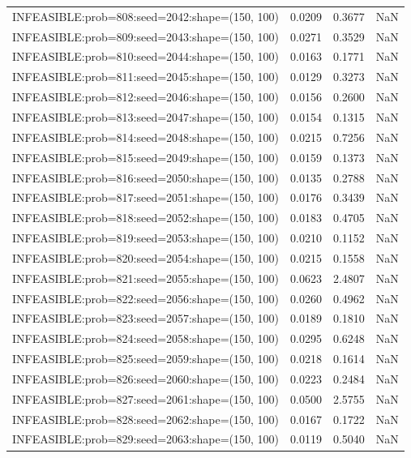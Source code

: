 \begin{longtable}{lccc}
INFEASIBLE:prob=808:seed=2042:shape=(150, 100) &   0.0209 &  0.3677 &    NaN \\
INFEASIBLE:prob=809:seed=2043:shape=(150, 100) &   0.0271 &  0.3529 &    NaN \\
INFEASIBLE:prob=810:seed=2044:shape=(150, 100) &   0.0163 &  0.1771 &    NaN \\
INFEASIBLE:prob=811:seed=2045:shape=(150, 100) &   0.0129 &  0.3273 &    NaN \\
INFEASIBLE:prob=812:seed=2046:shape=(150, 100) &   0.0156 &  0.2600 &    NaN \\
INFEASIBLE:prob=813:seed=2047:shape=(150, 100) &   0.0154 &  0.1315 &    NaN \\
INFEASIBLE:prob=814:seed=2048:shape=(150, 100) &   0.0215 &  0.7256 &    NaN \\
INFEASIBLE:prob=815:seed=2049:shape=(150, 100) &   0.0159 &  0.1373 &    NaN \\
INFEASIBLE:prob=816:seed=2050:shape=(150, 100) &   0.0135 &  0.2788 &    NaN \\
INFEASIBLE:prob=817:seed=2051:shape=(150, 100) &   0.0176 &  0.3439 &    NaN \\
INFEASIBLE:prob=818:seed=2052:shape=(150, 100) &   0.0183 &  0.4705 &    NaN \\
INFEASIBLE:prob=819:seed=2053:shape=(150, 100) &   0.0210 &  0.1152 &    NaN \\
INFEASIBLE:prob=820:seed=2054:shape=(150, 100) &   0.0215 &  0.1558 &    NaN \\
INFEASIBLE:prob=821:seed=2055:shape=(150, 100) &   0.0623 &  2.4807 &    NaN \\
INFEASIBLE:prob=822:seed=2056:shape=(150, 100) &   0.0260 &  0.4962 &    NaN \\
INFEASIBLE:prob=823:seed=2057:shape=(150, 100) &   0.0189 &  0.1810 &    NaN \\
INFEASIBLE:prob=824:seed=2058:shape=(150, 100) &   0.0295 &  0.6248 &    NaN \\
INFEASIBLE:prob=825:seed=2059:shape=(150, 100) &   0.0218 &  0.1614 &    NaN \\
INFEASIBLE:prob=826:seed=2060:shape=(150, 100) &   0.0223 &  0.2484 &    NaN \\
INFEASIBLE:prob=827:seed=2061:shape=(150, 100) &   0.0500 &  2.5755 &    NaN \\
INFEASIBLE:prob=828:seed=2062:shape=(150, 100) &   0.0167 &  0.1722 &    NaN \\
INFEASIBLE:prob=829:seed=2063:shape=(150, 100) &   0.0119 &  0.5040 &    NaN \\

\end{longtable}
